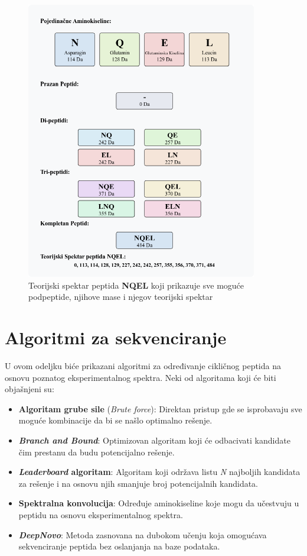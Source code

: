 \documentclass[12pt,oneside]{memoir}
\begin{document}
\begin{figure}[h]
  \centering
  \includegraphics[width=0.9\textwidth]{images/peptide-theoretical-spectrum.png}
  \caption{Teorijski spektar peptida \textbf{NQEL} koji prikazuje sve moguće podpeptide, njihove mase i njegov teorijski spektar}
  \label{fig:spektar}
\end{figure}


\chapter{Algoritmi za sekvenciranje}
U ovom odeljku biće prikazani algoritmi za određivanje cikličnog peptida na osnovu poznatog eksperimentalnog spektra. Neki od algoritama koji će biti objašnjeni su:
\begin{itemize}
    \item \textbf{Algoritam grube sile} (\emph{Brute force}): Direktan pristup gde se isprobavaju sve moguće kombinacije da bi se našlo optimalno rešenje.
    \item \textbf{\emph{Branch and Bound}}: Optimizovan algoritam koji će odbacivati kandidate čim prestanu da budu potencijalno rešenje.
    \item \textbf{\emph{Leaderboard} algoritam}: Algoritam koji održava listu \emph{N} najboljih kandidata za rešenje i na osnovu njih smanjuje broj potencijalnih kandidata.
    \item \textbf{Spektralna konvolucija}: Određuje aminokiseline koje mogu da učestvuju u peptidu na osnovu eksperimentalnog spektra.
    \item \textbf{\emph{DeepNovo}}: Metoda zasnovana na dubokom učenju koja omogućava sekvenciranje peptida bez oslanjanja na baze podataka.
\end{itemize}
\end{document}
